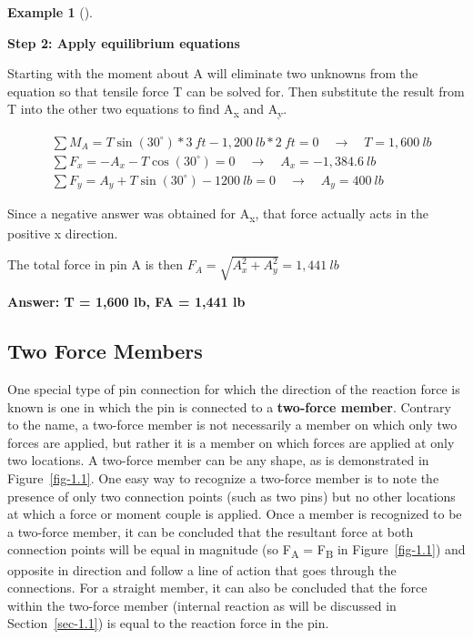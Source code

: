 \documentclass[
  letterpaper,
  DIV=11,
  numbers=noendperiod]{scrreprt}
\theoremstyle{definition}
\newtheorem{example}{Example}[chapter]
\theoremstyle{remark}
\begin{document}
\begin{tcolorbox}
\begin{example}[]
\begin{tcolorbox}
\textbf{Step 2: Apply equilibrium equations}

Starting with the moment about A will eliminate two unknowns from the
equation so that tensile force T can be solved for. Then substitute the
result from T into the other two equations to find A\textsubscript{x}
and A\textsubscript{y}.

\[
\begin{aligned}
& \sum M_A=T \sin (30^{\circ}) * 3{~ft}-1,200{~lb }*2{~ft}=0 \quad\rightarrow\quad T=1,600 {~lb} \\
& \sum F_x=-A_x-T \cos (30^{\circ})=0 \quad\rightarrow\quad A_x=-1,384.6{~lb} \\
& \sum F_y=A_y+T \sin (30^{\circ})-1200{~lb}=0 \quad\rightarrow\quad A_y= 400{~lb}
\end{aligned}
\]

Since a negative answer was obtained for A\textsubscript{x}, that force
actually acts in the positive x direction.

The total force in pin A is then \(F_A=\sqrt{A_x^2+A_y^2}=1,441{~lb}\)

\textbf{Answer: T = 1,600 lb, FA = 1,441 lb}

\end{tcolorbox}

\end{example}

\end{tcolorbox}

\subsection{Two Force Members}\label{two-force-members}

One special type of pin connection for which the direction of the
reaction force is known is one in which the pin is connected to a
\textbf{two-force member}. Contrary to the name, a two-force member is
not necessarily a member on which only two forces are applied, but
rather it is a member on which forces are applied at only two locations.
A two-force member can be any shape, as is demonstrated in
Figure~\ref{fig-1.1}. One easy way to recognize a two-force member is to
note the presence of only two connection points (such as two pins) but
no other locations at which a force or moment couple is applied. Once a
member is recognized to be a two-force member, it can be concluded that
the resultant force at both connection points will be equal in magnitude
(so F\textsubscript{A} = F\textsubscript{B} in Figure~\ref{fig-1.1}) and
opposite in direction and follow a line of action that goes through the
connections. For a straight member, it can also be concluded that the
force within the two-force member (internal reaction as will be
discussed in Section~\ref{sec-1.1}) is equal to the reaction force in
the pin.
\end{document}
